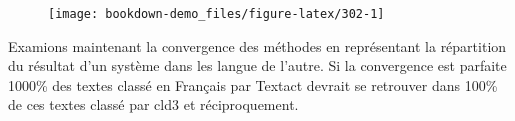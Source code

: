\documentclass[
]{book}
\newenvironment{Shaded}{\begin{snugshade}}{\end{snugshade}}
\newcommand{\DataTypeTok}[1]{\textcolor[rgb]{0.13,0.29,0.53}{#1}}
\newcommand{\DecValTok}[1]{\textcolor[rgb]{0.00,0.00,0.81}{#1}}
\newcommand{\KeywordTok}[1]{\textcolor[rgb]{0.13,0.29,0.53}{\textbf{#1}}}
\newcommand{\NormalTok}[1]{#1}
\newcommand{\OperatorTok}[1]{\textcolor[rgb]{0.81,0.36,0.00}{\textbf{#1}}}
\newcommand{\StringTok}[1]{\textcolor[rgb]{0.31,0.60,0.02}{#1}}
\begin{document}
\begin{Shaded}
\end{Shaded}

\begin{figure}

{\centering \texttt{[image: bookdown-demo\_files/figure-latex/302-1]} 

}

\end{figure}

Examions maintenant la convergence des méthodes en représentant la répartition du résultat d'un système dans les langue de l'autre. Si la convergence est parfaite 1000\% des textes classé en Français par Textact devrait se retrouver dans 100\% de ces textes classé par cld3 et réciproquement.
\end{document}

